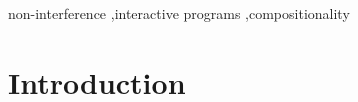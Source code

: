 \documentclass[preprint,5p,twocolumn]{elsarticle}
\begin{document}
\begin{frontmatter}


\begin{keyword}
non-interference \sep interactive programs \sep compositionality
\end{keyword}

\end{frontmatter}


\newcommand{\xmark}{{\color{red}\ding{55}}}%
\newcommand{\cmark}{{\color{darkgreen}\checkmark}}%


\newcommand{\sA}{s_{\mathtt{A}}}
\newcommand{\sB}{s_{\mathtt{B}}}
\newcommand{\sC}{s_{\mathtt{C}}}
\newcommand{\sD}{s_{\mathtt{D}}}
\newcommand{\sE}{s_{\mathtt{E}}}
\newcommand{\sF}{s_{\mathtt{F}}}
\newcommand{\PA}{P_{\mathtt{A}}}
\newcommand{\PB}{P_{\mathtt{B}}}
\newcommand{\PC}{P_{\mathtt{C}}}
\newcommand{\pOut}[2]{\mathtt{out}_{#1}(#2)}
\newcommand{\pIn}[2]{\mathtt{in}_{#1}(#2)}
\newcommand{\pAssign}[2]{#1 := #2}
\newcommand{\pComp}[2]{#1 \mid #2}
\newcommand{\Lattice}{\mathcal{L}}
\renewcommand{\doteq}{\overset{.}{=}}
\newcommand{\Pow}[1]{\mathcal{P}(#1)}
\newcommand{\leanref}[1]{\hfill\textnormal{\small\textsf{[Lean:\,\texttt{#1}]}}}


\section{Introduction}
\end{document}
